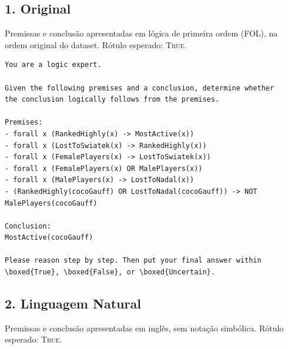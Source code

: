 \subsection{1. Original}
\label{ap:prompt-original}

Premissas e conclusão apresentadas em lógica de primeira ordem (FOL),
na ordem original do dataset. Rótulo esperado: \textsc{True}.

\begin{lstlisting}[caption={Prompt -- condição Original.},
                   label={lst:prompt-original}]
You are a logic expert.

Given the following premises and a conclusion, determine whether
the conclusion logically follows from the premises.

Premises:
- forall x (RankedHighly(x) -> MostActive(x))
- forall x (LostToSwiatek(x) -> RankedHighly(x))
- forall x (FemalePlayers(x) -> LostToSwiatek(x))
- forall x (FemalePlayers(x) OR MalePlayers(x))
- forall x (MalePlayers(x) -> LostToNadal(x))
- (RankedHighly(cocoGauff) OR LostToNadal(cocoGauff)) -> NOT MalePlayers(cocoGauff)

Conclusion:
MostActive(cocoGauff)

Please reason step by step. Then put your final answer within
\boxed{True}, \boxed{False}, or \boxed{Uncertain}.
\end{lstlisting}

\subsection{2. Linguagem Natural}
\label{ap:prompt-nl}

Premissas e conclusão apresentadas em inglês, sem notação simbólica.
Rótulo esperado: \textsc{True}.

